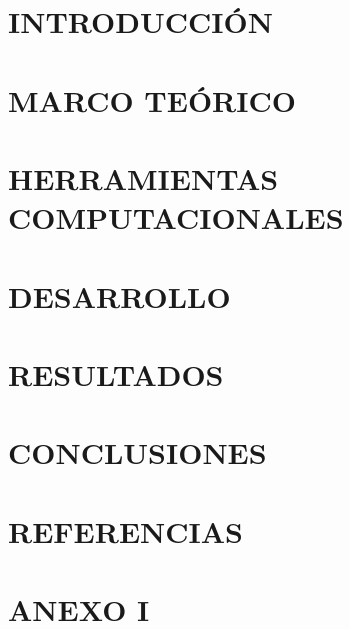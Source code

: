 \tableofcontents

\pagebreak
\renewcommand{\listfigurename}{Índice de Figuras}
\listoffigures
\pagebreak
\renewcommand{\listtablename}{Índice de Tablas}
\listoftables
\pagebreak


{}

\chapter{INTRODUCCIÓN}\label{capitulo:INTRODUCCION}
 \pagebreak

\chapter{MARCO TEÓRICO}\label{capitulo:MARCO_TEORICO}
 \pagebreak

\chapter{HERRAMIENTAS COMPUTACIONALES}\label{capitulo:HERRAMIENTAS_COMPUTACIONALES}
 \pagebreak

\chapter{DESARROLLO}\label{capitulo:DESARROLLO}
 \pagebreak

\chapter{RESULTADOS}\label{capitulo:RESULTADOS}
 \pagebreak

\chapter{CONCLUSIONES}\label{capitulo:CONCLUSIONES}
 \pagebreak

\chapter{REFERENCIAS}
\printbibliography[heading=none] \pagebreak

\chapter{ANEXO I}
 \pagebreak



\printbibliography[heading=none]
